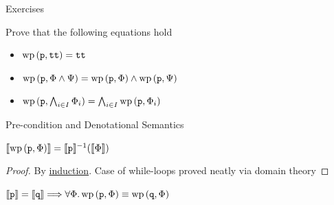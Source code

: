 \documentclass{beamer}
\begin{document}
\begin{frame}{Exercises}

        Prove that the following equations hold
        \\[10pt]
        \begin{itemize}
                \item $\mathrm{wp} \, (\mathtt{p}, \mathtt{tt}) = \mathtt{tt}$
                \\[10pt]
                \item $\mathrm{wp} \, (\mathtt{p}, \Phi \wedge \Psi )
                = \mathrm{wp} \, (\mathtt{p}, \Phi) \wedge 
                \mathrm{wp} \, (\mathtt{p}, \Psi )$
                \\[10pt]
                \item $\mathrm{wp} \, (\mathtt{p}, \bigwedge_{i \in I} \Phi_i )
                = \bigwedge_{i \in I} \mathrm{wp} \, (\mathtt{p}, \Phi_i)$
        \end{itemize}

\end{frame}

\begin{frame}{Pre-condition and Denotational Semantics}

        \begin{theorem}
                $\llbracket \mathrm{wp} \, (\mathtt{p}, \Phi) \rrbracket = \llbracket \mathtt{p} \rrbracket^{-1}(\llbracket \Phi \rrbracket)$
        \end{theorem}

        \begin{proof}
                By \alert{\underline{induction}}. Case of while-loops
                proved neatly via domain theory
        \end{proof}

        \bigskip
        \begin{corollary}
                $\llbracket \mathtt{p} \rrbracket =
                \llbracket \mathtt{q} \rrbracket \Longrightarrow \forall \Phi. \, \mathrm{wp} \, (\mathtt{p}, \Phi)
                \equiv \mathrm{wp} \, (\mathtt{q}, \Phi)$
        \end{corollary}
\end{frame}
\end{document}
